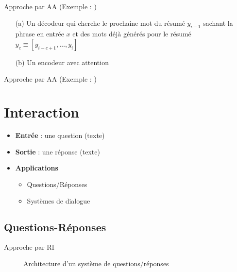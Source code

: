\documentclass{KodeBook}
\begin{document}
Approche par AA (Exemple : \cite{15-rush-al})

\begin{center}
\end{center}

\begin{itemize}
	\item[(a)] Un décodeur qui cherche le prochaine mot du résumé $y_{i+1}$ sachant la phrase en entrée $x$ et des mots déjà générés pour le résumé $y_c \equiv [y_{i-c+1},\ldots, y_i]$
	\item[(b)] Un encodeur avec attention
\end{itemize}

Approche par AA (Exemple : \cite{18-narayan-al})


\section{Interaction}

\begin{itemize}
	\item \textbf{Entrée} : une question (texte)
	\item \textbf{Sortie} : une réponse (texte)
	\item \textbf{Applications} 
	\begin{itemize}
		\item Questions/Réponses
		\item Systèmes de dialogue
	\end{itemize}
\end{itemize}

\subsection{Questions-Réponses}


Approche par RI

\begin{figure}
	\caption{Architecture d'un système de questions/réponses \cite{2019-jurafsky-martin}}
\end{figure}
\end{document}
